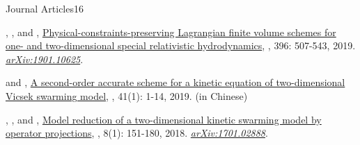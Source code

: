 \begin{cvpublicationsection}{Journal Articles}{16}
%
\item {}, , and , \href{https://doi.org/10.1016/j.jcp.2019.06.055}{Physical-constraints-preserving Lagrangian finite volume schemes for one- and two-dimensional special relativistic hydrodynamics}, , 396: 507-543, 2019. \href{https://arxiv.org/abs/1901.10625}{\em arXiv:1901.10625}.
%
\item {} and , \href{http://www.jxtu.net/xtdxxbzr/ch/reader/view_abstract.aspx?file_no=201901001&flag=1}{A second-order accurate scheme for a kinetic equation of two-dimensional Vicsek swarming model}, , 41(1): 1-14, 2019. (in Chinese)
%
\item {}, , and , \href{https://doi.org/10.4208/eajam.170617.141117a}{Model reduction of a two-dimensional kinetic swarming model by operator projections}, , 8(1): 151-180, 2018. \href{https://arxiv.org/abs/1701.02888}{\em arXiv:1701.02888}.
\end{cvpublicationsection}

